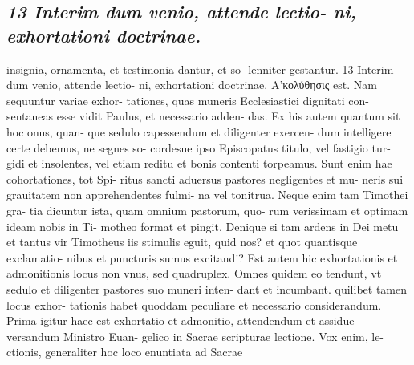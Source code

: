\documentclass{article}
\begin{document}
\begin{pages}
\subsection*{\textit{13 Interim dum venio, attende lectio- ni, exhortationi doctrinae.}}insignia, ornamenta, et testimonia dantur, et so- lenniter gestantur. 13 Interim dum venio, attende lectio- ni, exhortationi doctrinae. Α’κολύθησις est. Nam sequuntur variae exhor- tationes, quas muneris Ecclesiastici dignitati con- sentaneas esse vidit Paulus, et necessario adden- das. Ex his autem quantum sit hoc onus, quan- que sedulo capessendum et diligenter exercen- dum intelligere certe debemus, ne segnes so- cordesue ipso Episcopatus titulo, vel fastigio tur- gidi et insolentes, vel etiam reditu et bonis contenti torpeamus. Sunt enim hae cohortationes, tot Spi- ritus sancti aduersus pastores negligentes et mu- neris sui grauitatem non apprehendentes fulmi- na vel tonitrua. Neque enim tam Timothei gra- tia dicuntur ista, quam omnium pastorum, quo- rum verissimam et optimam ideam nobis in Ti- motheo format et pingit. Denique si tam ardens in Dei metu et tantus vir Timotheus iis stimulis eguit, quid nos? et quot quantisque exclamatio- nibus et puncturis sumus excitandi? Est autem hic exhortationis et admonitionis locus non vnus, sed quadruplex. Omnes quidem eo tendunt, vt sedulo et diligenter pastores suo muneri inten- dant et incumbant. quilibet tamen locus exhor- tationis habet quoddam peculiare et necessario considerandum. Prima igitur haec est exhortatio et admonitio, attendendum et assidue versandum Ministro Euan- gelico in Sacrae scripturae lectione. Vox enim, le- ctionis, generaliter hoc loco enuntiata ad Sacrae  \pend

\end{pages}
\end{document}
